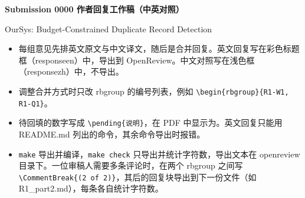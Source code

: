 \documentclass[a4paper,fontset=none,zihao=5]{ctexart}
\begin{document}
{\centering
{\Large\bfseries Submission 0000 作者回复工作稿（中英对照）}\par\smallskip
{\small OurSys: Budget-Constrained Duplicate Record Detection}\par}
\medskip

\begin{itemize}\small
\item 每组意见先排英文原文与中文译文，随后是合并回复。英文回复写在彩色标题框（responseen）中，导出到 OpenReview。中文对照写在浅色框（responsezh）中，不导出。
\item 调整合并方式时只改 rbgroup 的编号列表，例如 \texttt{\textbackslash begin\{rbgroup\}\{R1-W1, R1-Q1\}}。
\item 待回填的数字写成 \texttt{\textbackslash pending\{说明\}}，在 PDF 中显示为。英文回复只能用 README.md 列出的命令，其余命令导出时报错。
\item \texttt{make} 导出并编译，\texttt{make check} 只导出并统计字符数，导出文本在 openreview 目录下。一位审稿人需要多条评论时，在两个 rbgroup 之间写 \texttt{\textbackslash CommentBreak\{(2 of 2)\}}，其后的回复块导出到下一份文件（如 R1\_part2.md），每条各自统计字符数。
\end{itemize}

\RBScoreTable

\GeneralSection
\end{document}
